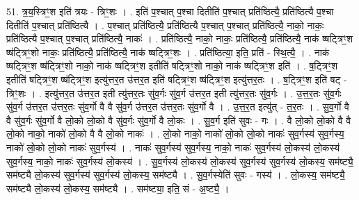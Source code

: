\documentclass[17pt]{extarticle}
\begin{document}
51. त्र॒य॒स्त्रिꣳ॒॒श इति॑ त्रयः - त्रिꣳ॒॒शः । . इति॑ प॒श्चात् प॒श्चा दितीति॑ प॒श्चात् प्रति॑ष्ठित्यै॒ प्रति॑ष्ठित्यै प॒श्चा दितीति॑ प॒श्चात् प्रति॑ष्ठित्यै । . प॒श्चात् प्रति॑ष्ठित्यै॒ प्रति॑ष्ठित्यै प॒श्चात् प॒श्चात् प्रति॑ष्ठित्यै॒ नाको॒ नाकः॒ प्रति॑ष्ठित्यै प॒श्चात् प॒श्चात् प्रति॑ष्ठित्यै॒ नाकः॑ । . प्रति॑ष्ठित्यै॒ नाको॒ नाकः॒ प्रति॑ष्ठित्यै॒ प्रति॑ष्ठित्यै॒ नाक॑ ष्षट्त्रिꣳ॒॒श ष्ष॑ट्त्रिꣳ॒॒शो नाकः॒ प्रति॑ष्ठित्यै॒ प्रति॑ष्ठित्यै॒ नाक॑ ष्षट्त्रिꣳ॒॒शः । . प्रति॑ष्ठित्या॒ इति॒ प्रति॑ - स्थि॒त्यै॒ । . नाक॑ ष्षट्त्रिꣳ॒॒श ष्ष॑ट्त्रिꣳ॒॒शो नाको॒ नाक॑ ष्षट्त्रिꣳ॒॒श इतीति॑ षट्त्रिꣳ॒॒शो नाको॒ नाक॑ ष्षट्त्रिꣳ॒॒श इति॑ । . ष॒ट्त्रिꣳ॒॒श इतीति॑ षट्त्रिꣳ॒॒श ष्ष॑ट्त्रिꣳ॒॒श इत्यु॑त्तर॒त उ॑त्तर॒त इति॑ षट्त्रिꣳ॒॒श ष्ष॑ट्त्रिꣳ॒॒श इत्यु॑त्तर॒तः । . ष॒ट्त्रिꣳ॒॒श इति॑ षट् - त्रिꣳ॒॒शः । . इत्यु॑त्तर॒त उ॑त्तर॒त इती त्यु॑त्तर॒तः सु॑व॒र्गः सु॑व॒र्ग उ॑त्तर॒त इती त्यु॑त्तर॒तः सु॑व॒र्गः । . उ॒त्त॒र॒तः सु॑व॒र्गः सु॑व॒र्ग उ॑त्तर॒त उ॑त्तर॒तः सु॑व॒र्गो वै वै सु॑व॒र्ग उ॑त्तर॒त उ॑त्तर॒तः सु॑व॒र्गो वै । . उ॒त्त॒र॒त इत्यु॑त् - त॒र॒तः । . सु॒व॒र्गो वै वै सु॑व॒र्गः सु॑व॒र्गो वै लो॒को लो॒को वै सु॑व॒र्गः सु॑व॒र्गो वै लो॒कः । . सु॒व॒र्ग इति॑ सुवः - गः । . वै लो॒को लो॒को वै वै लो॒को नाको॒ नाको॑ लो॒को वै वै लो॒को नाकः॑ । . लो॒को नाको॒ नाको॑ लो॒को लो॒को नाकः॑ सुव॒र्गस्य॑ सुव॒र्गस्य॒ नाको॑ लो॒को लो॒को नाकः॑ सुव॒र्गस्य॑ । . नाकः॑ सुव॒र्गस्य॑ सुव॒र्गस्य॒ नाको॒ नाकः॑ सुव॒र्गस्य॑ लो॒कस्य॑ लो॒कस्य॑ सुव॒र्गस्य॒ नाको॒ नाकः॑ सुव॒र्गस्य॑ लो॒कस्य॑ । . सु॒व॒र्गस्य॑ लो॒कस्य॑ लो॒कस्य॑ सुव॒र्गस्य॑ सुव॒र्गस्य॑ लो॒कस्य॒ सम॑ष्ट्यै॒ सम॑ष्ट्यै लो॒कस्य॑ सुव॒र्गस्य॑ सुव॒र्गस्य॑ लो॒कस्य॒ सम॑ष्ट्यै । . सु॒व॒र्गस्येति॑ सुवः - गस्य॑ । . लो॒कस्य॒ सम॑ष्ट्यै॒ सम॑ष्ट्यै लो॒कस्य॑ लो॒कस्य॒ सम॑ष्ट्यै । . सम॑ष्ट्या॒ इति॒ सं - अ॒ष्ट्यै॒ । \newline
\pagebreak
{}
\end{document}
